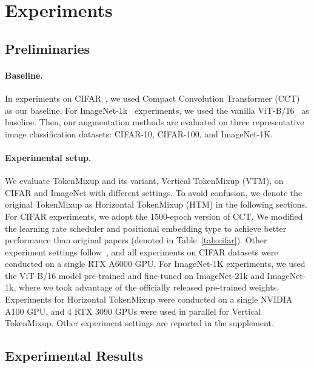 \documentclass{article}
\begin{document}
 

\section{Experiments}
\label{section:experiments}


\subsection{Preliminaries}
\vspace{-2mm}
\paragraph{Baseline.}
In experiments on CIFAR~\cite{krizhevsky2009learning}, we used Compact Convolution Transformer (CCT)~\cite{hassani2021escaping} as our baseline.
For ImageNet-1k~\cite{ILSVRC15} experiments, we used the vanilla ViT-B/16~\cite{dosovitskiy2020image} as baseline.
Then, our augmentation methods are evaluated on three representative image classification datasets: CIFAR-10, CIFAR-100, and ImageNet-1K.

\vspace{-2mm}
\paragraph{Experimental setup.}
We evaluate TokenMixup and its variant, Vertical TokenMixup (VTM), on CIFAR and ImageNet with different settings.
To avoid confusion, we denote the original TokenMixup as Horizontal TokenMixup (HTM) in the following sections.
For CIFAR experiments, we adopt the 1500-epoch version of CCT.
We modified the learning rate scheduler and positional embedding type to achieve better performance than original papers (denoted  in Table~\ref{tab:cifar}).
Other experiment settings follow~\cite{hassani2021escaping}, and all experiments on CIFAR datasets were conducted on a single RTX A6000 GPU.
For ImageNet-1K experiments, we used the ViT-B/16 model pre-trained and fine-tuned on ImageNet-21k and ImageNet-1k, where we took advantage of the officially released pre-trained weights.
Experiments for Horizontal TokenMixup were conducted on a single NVIDIA A100 GPU, and 4 RTX 3090 GPUs were used in parallel for Vertical TokenMixup.
Other experiment settings are reported in the supplement.

\vspace{-2mm} 

\subsection{Experimental Results}
\vspace{1mm}
\end{document}
